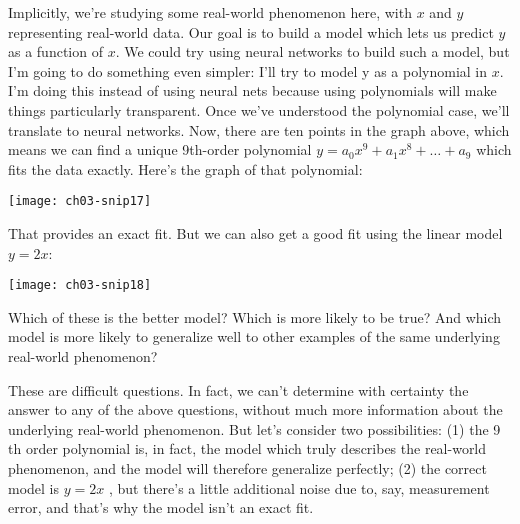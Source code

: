 Implicitly, we're studying some real-world phenomenon here, with $x$ and $y$ representing real-world data. Our goal is to build a model which lets us predict $y$ as a function of $x$. We could try using neural networks to build such a model, but I'm going to do something even simpler: I'll try to model y as a polynomial in $x$. I'm doing this instead of using neural nets because using polynomials will make things particularly transparent. Once we've understood the polynomial case, we'll translate to neural networks. Now, there are ten points in the graph above, which means we can find a unique 9th-order polynomial $y=a_{0} x^{9}+a_{1} x^{8}+\ldots+a_{9}$ which fits the data exactly. Here's the graph of that polynomial:
\begin{marginfigure}
\texttt{[image: ch03-snip17]}
\end{marginfigure}
That provides an exact fit. But we can also get a good fit using the linear model $y=2x$:
\begin{marginfigure}
\texttt{[image: ch03-snip18]}
\end{marginfigure}
Which of these is the better model? Which is more likely to be true? And which model is more likely to generalize well to other examples of the same underlying real-world phenomenon?

These are difficult questions. In fact, we can't determine with certainty the answer to any of the above questions, without much more information about the underlying real-world phenomenon. But let's consider two possibilities: (1) the 9
th order polynomial is, in fact, the model which truly describes the real-world phenomenon, and the model will therefore generalize perfectly; (2) the correct model is $y=2x$ , but there's a little additional noise due to, say, measurement error, and that's why the model isn't an exact fit.

